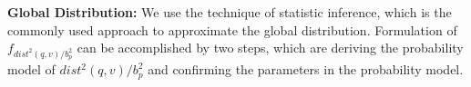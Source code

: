 \noindent\textbf{Global Distribution:} We use the technique of statistic inference, which is the commonly used approach to approximate the global distribution. Formulation of $f_{dist^2(q,v)/b^2_p}$ can be accomplished by two steps, which are deriving the probability model of $dist^2(q,v)/b^2_p$ and confirming the parameters in the probability model.


